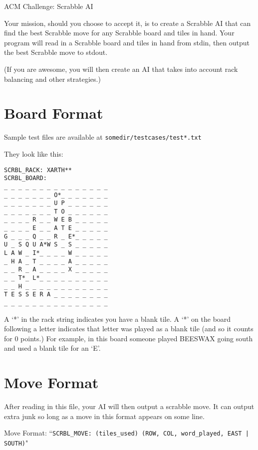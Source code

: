 \documentclass{article}
\begin{document}
\ttfamily

\begin{center}
\Huge{ACM Challenge: Scrabble AI}\\

\end{center}
\large
Your mission, should you choose to accept it, is to create a Scrabble AI that can find the best Scrabble move for any Scrabble board and tiles in hand. Your program will read in a Scrabble board and tiles in hand from stdin, then output the best Scrabble move to stdout. 

(If you are awesome, you will then create an AI that takes into account rack balancing and other strategies.)

\section{Board Format}

Sample test files are available at \verb=somedir/testcases/test*.txt=

They look like this: 

\begin{verbatim}
SCRBL_RACK: XARTH**
SCRBL_BOARD:
_ _ _ _ _ _ _ _ _ _ _ _ _ _ _ 
_ _ _ _ _ _ _ O*_ _ _ _ _ _ _ 
_ _ _ _ _ _ _ U P _ _ _ _ _ _ 
_ _ _ _ _ _ _ T O _ _ _ _ _ _ 
_ _ _ _ R _ _ W E B _ _ _ _ _ 
_ _ _ _ E _ _ A T E _ _ _ _ _ 
G _ _ _ Q _ _ R _ E*_ _ _ _ _ 
U _ S Q U A*W S _ S _ _ _ _ _ 
L A W _ I*_ _ _ _ W _ _ _ _ _ 
_ H A _ T _ _ _ _ A _ _ _ _ _ 
_ _ R _ A _ _ _ _ X _ _ _ _ _ 
_ _ T*_ L*_ _ _ _ _ _ _ _ _ _ 
_ _ H _ _ _ _ _ _ _ _ _ _ _ _ 
T E S S E R A _ _ _ _ _ _ _ _ 
_ _ _ _ _ _ _ _ _ _ _ _ _ _ _ 
\end{verbatim} 

A `*' in the rack string indicates you have a blank tile. A `*' on the board following a letter indicates that letter was played as a blank tile (and so it counts for 0 points.) For example, in this board someone played BEESWAX going south and used a blank tile for an `E'. 

\section{Move Format}
After reading in this file, your AI will then output a scrabble move. It can output extra junk so long as a move in this format appears on some line. 

Move Format: ``\verb=SCRBL_MOVE: (tiles_used) (ROW, COL, word_played, EAST | SOUTH)="
\end{document}
